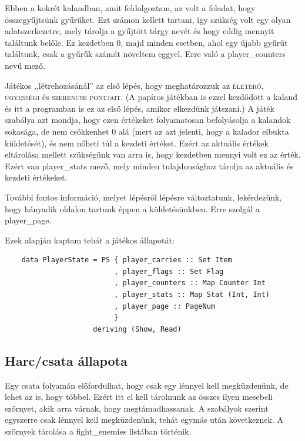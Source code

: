 \documentclass[12pt,a4paper,oneside]{report}
\newcommand{\xstate}[1]{{\color{State}#1}}
\newcommand{\stat}{\textsc}
\begin{document}
    Ebben a kokrét kalandban, amit feldolgoztam, az volt a feladat,
    hogy összegyűjtsünk gyűrűket. Ezt számon kellett tartani, így
    szükség volt egy olyan adatszerkezetre, mely tárolja a gyűjtött
    tárgy nevét és hogy eddig mennyit találtunk belőle. Ez kezdetben
    0, majd minden esetben, ahol egy újabb gyűrűt találtunk, csak a
    gyűrűk számát növeltem eggyel. Erre való a
    \xstate{player\_counters} nevű mező.

    Játékos ,,létrehozásánál'' az első lépés, hogy meghatározzuk az
    \stat{életerő}, \stat{ügyességi} és \stat{szerencse pontjait}. (A
    papíros játékban is ezzel kezdődött a kaland és itt a programban
    is ez az első lépés, amikor elkezdünk játszani.) A játék szabálya
    azt mondja, hogy ezen értékeket folyamatosan befolyásolja a
    kalandok sokasága, de nem csökkenhet 0 alá (mert az azt jelenti,
    hogy a kalador elbukta küldetését), és nem nőheti túl a kezdeti
    értéket. Ezért az aktuális értékek eltárolása mellett szükségünk
    van arra is, hogy kezdetben mennyi volt ez az érték. Ezért van
    \xstate{player\_stats} mező, mely minden tulajdonsághoz tárolja az aktuális
    és kezdeti értékeket.

    További fontos információ, melyet lépésről lépésre változtatunk,
    lekérdezünk, hogy hányadik oldalon tartunk éppen a
    küldetésünkben. Erre szolgál a \xstate{player\_page}.

    Ezek alapján kaptam tehát a játékos állapotát:
    \begin{verbatim}
    data PlayerState = PS { player_carries :: Set Item
                          , player_flags :: Set Flag
                          , player_counters :: Map Counter Int
                          , player_stats :: Map Stat (Int, Int)
                          , player_page :: PageNum
                          }
                     deriving (Show, Read)
    \end{verbatim}

    \subsection{Harc/csata állapota}
    Egy csata folyamán előfordulhat, hogy csak egy lénnyel kell
    megküzdenünk, de lehet az is, hogy többel. Ezért itt el kell
    tárolnunk az összes ilyen mesebeli szörnyet, akik arra várnak,
    hogy megtámadhassanak. A szabályok szerint egyszerre csak lénnyel
    kell megküzdenünk, tehát egymás után következnek. A szörnyek
    tárolása a \xstate{fight\_enemies} listában történik.
\end{document}
